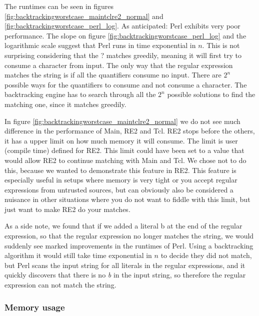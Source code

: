 The runtimes can be seen in figures
\ref{fig:backtrackingworstcase_maintclre2_normal} and
\ref{fig:backtrackingworstcase_perl_log}. As anticipated: Perl
exhibits very poor performance. The slope on figure
\vref{fig:backtrackingworstcase_perl_log} and the logarithmic scale
suggest that Perl runs in time exponential in $n$. This is not
surprising considering that the \textsf{?} matches greedily,
meaning it will first try to consume a character from input. The only
way that the regular expression matches the string is if all the
quantifiers consume no input. There are $2^n$ possible ways for the
quantifiers to consume and not consume a character. The backtracking
engine has to search through all the $2^n$ possible solutions to find
the matching one, since it matches greedily.

In figure \vref{fig:backtrackingworstcase_maintclre2_normal} we do not
see much difference in the performance of Main, RE2 and Tcl. RE2 stops
before the others, it has a upper limit on how much memory it will
consume. The limit is user (compile time) defined for RE2. This limit
could have been set to a value that would allow RE2 to continue
matching with Main and Tcl. We chose not to do this, because we wanted
to demonstrate this feature in RE2. This feature is especially useful
in setups where memory is very tight or you accept regular expressions
from untrusted sources, but can obviously also be considered a
nuisance in other situations where you do not want to fiddle with this
limit, but just want to make RE2 do your matches.

As a side note, we found that if we added a literal \textsf{b} at the
end of the regular expression, so that the regular expression no
longer matches the string, we would suddenly see marked improvements
in the runtimes of Perl. Using a backtracking algorithm it would still
take time exponential in $n$ to decide they did not match, but Perl
scans the input string for all literals in the regular expressions,
and it quickly discovers that there is no \textsl{b} in the input
string, so therefore the regular expression can not match the string.

\subsubsection*{Memory usage}

